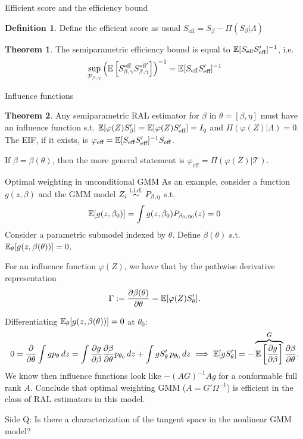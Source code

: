 \documentclass[10pt,aspectratio=169,handout]{beamer}
\theoremstyle{definition}
\newtheorem{thm}{Theorem}
\newtheorem{defn}{Definition}
\begin{document}
\begin{frame}{Efficient score and the efficiency bound}
  \begin{defn}
    Define the efficient score as usual $S_\text{eff} = S_\beta - \Pi
    (S_\beta | \Lambda)$
  \end{defn}
  
  \begin{thm}
    The semiparametric efficiency bound is equal to $\mathbb{E}[S_{\text{eff}}
    S_\text{eff}']^
    {-1}$, i.e. \[
    \sup_{\mathcal P_{\beta,\gamma}} \left({\mathbb{E}\left[{S_{\beta,\gamma}^
  {\text{eff}} S_{\beta,\gamma}^{\text{eff}'}}\right]}\right)^{-1} = \mathbb{E}[S_{\text{eff}}
    S_\text{eff}']^
    {-1}
    \]
  \end{thm}
\end{frame}

\begin{frame}{Influence functions}
  \begin{thm}
    Any semiparametric RAL estimator for $\beta$ in $\theta = 
    [\beta,\eta]$ must have an influence
    function s.t. $\mathbb{E}[\varphi(Z) S_\beta'] = \mathbb{E}[\varphi(Z) S'_{
    \text{eff}}] = I_q$ and $\Pi(\varphi(Z) | \Lambda)=  0$.
    The EIF, if it exists, is $\varphi_{\text{eff}} = \mathbb{E}[S_{
    \text{eff}}S'_{
    \text{eff}}]^{-1}S_{
    \text{eff}}$.
    
    If $\beta = \beta(\theta)$, then the more general statement is
    $\varphi_{\text{eff}} = \Pi(\varphi(Z) | \mathcal T)$.
  \end{thm}
\end{frame}

\begin{frame}{Optimal weighting in unconditional GMM}
\small
    As an example, consider a function $g(z,\beta)$ and the GMM model $Z_i
    \overset{\mathrm{i.i.d.}}{\sim} P_{\beta,\eta}$ s.t. \[
    \mathbb{E}[g(z,\beta_0)] = \int g(z,\beta_0) P_{\beta_0,\eta_0}(z) = 0
    \]
    Consider a parametric submodel indexed by $\theta$. Define $\beta
    (\theta)$ s.t. $\mathbb{E}_{\theta}[g(z,\beta(\theta))] = 0$. 
    
    
    For an influence function $\varphi(Z)$, we have that by the pathwise
    derivative representation \[
    \Gamma := \frac{\partial{\beta(\theta)}}{\partial{\theta}} = \mathbb{E}[\varphi(Z) S_\theta'].
    \]
      
    Differentiating $\mathbb{E}_\theta[g(z,\beta(\theta))] = 0$ at $\theta_0$:
    \vspace{-1em}
    \[
    0 = \frac{\partial{}}{\partial{\theta}} \int g p_\theta\,dz = \int \frac{\partial{g}}{\partial{\beta}} 
    \frac{\partial{\beta}}{\partial{\theta}} p_{\theta_0}\,dz +
    \int g S_\theta'\,p_{\theta_0}\,dz \implies \mathbb{E}[g S_\theta'] = -
    \overbrace{\mathbb{E}
    \left[{\frac{\partial{g}}{\partial{\beta}}}\right]}^{G} \frac{\partial{\beta}}{\partial{\theta}}.
    \]
    We know then influence functions look like $-(AG)^{-1} Ag$ for a conformable
    full rank $A$. Conclude that optimal weighting GMM ($A = G'\Omega^ {-1}$) is
    efficient
    \alert{in the class of RAL estimators in this model}.
    
    Side Q: Is there a characterization of the tangent space in the
    nonlinear GMM model?
\end{frame}
\end{document}
